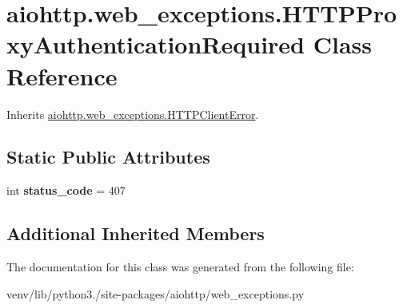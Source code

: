 \hypertarget{classaiohttp_1_1web__exceptions_1_1_h_t_t_p_proxy_authentication_required}{}\section{aiohttp.\+web\+\_\+exceptions.\+H\+T\+T\+P\+Proxy\+Authentication\+Required Class Reference}
\label{classaiohttp_1_1web__exceptions_1_1_h_t_t_p_proxy_authentication_required}


Inherits \hyperlink{classaiohttp_1_1web__exceptions_1_1_h_t_t_p_client_error}{aiohttp.\+web\+\_\+exceptions.\+H\+T\+T\+P\+Client\+Error}.

\subsection*{Static Public Attributes}
\begin{DoxyCompactItemize}
\item 
\mbox{\label{classaiohttp_1_1web__exceptions_1_1_h_t_t_p_proxy_authentication_required_a0e9f61ba06d6621a27963c17e9f88587}} 
int {\bfseries status\+\_\+code} = 407
\end{DoxyCompactItemize}
\subsection*{Additional Inherited Members}


The documentation for this class was generated from the following file\+:\begin{DoxyCompactItemize}
\item 
venv/lib/python3./site-\/packages/aiohttp/web\+\_\+exceptions.\+py\end{DoxyCompactItemize}
